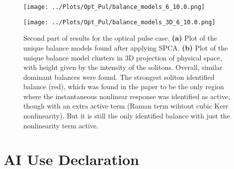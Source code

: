 \documentclass[12pt]{report} %
\begin{document}
\begin{figure}[htbp]
  \centering
  \begin{minipage}[b]{0.6\textwidth}
      \centering
      \texttt{[image: ../Plots/Opt\_Pul/balance\_models\_6\_10.0.png]}
      \subcaption{}
  \end{minipage}

  \begin{minipage}[b]{0.7\textwidth}
    \centering
    \texttt{[image: ../Plots/Opt\_Pul/balance\_models\_3D\_6\_10.0.png]}
    \subcaption{}
  \end{minipage}

  \caption{Second part of results for the optical pulse case. \textbf{(a)} Plot of the unique balance models found after applying SPCA. \textbf{(b)} Plot of the unique balance model clusters in 3D projection of physical space, with height given by the intensity of the solitons. Overall, similar dominant balances were found. The strongest soliton identified balance (red), which was found in the paper to be the only region where the instantaneous nonlinear response was identified as active, though with an extra active term (Raman term wihtout cubic Kerr nonlinearity). But it is still the only identified balance with just the nonlinearity term active.}
  \label{fig:Opt_Pul_results_2}
\end{figure}

\newpage

\section{AI Use Declaration}
\end{document}
